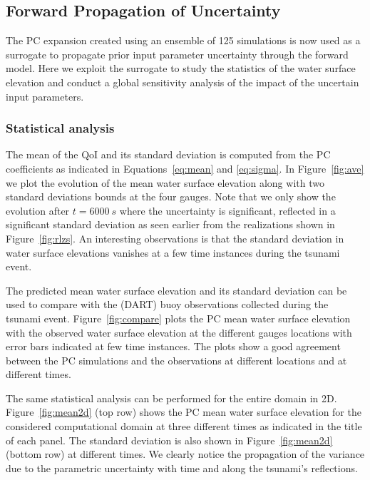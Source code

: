 \subsection{Forward Propagation of Uncertainty}
\label{sec:forward}
The PC expansion created using an ensemble of 125 \geoclaw simulations
is now used as a surrogate to propagate prior input parameter uncertainty 
through the forward model.  Here we exploit the surrogate 
to study the statistics of the water surface elevation and conduct 
a global sensitivity analysis of the impact of the uncertain input parameters.

\subsubsection{Statistical analysis}
The mean of the QoI and its standard deviation is computed
from the PC coefficients as indicated in Equations~\eqref{eq:mean} and \eqref{eq:sigma}. 
In Figure~\ref{fig:ave} we plot the evolution of
the mean water surface elevation along with two standard deviations
bounds at the four gauges.  
Note that we only show the evolution after $t=6000~s$ where the uncertainty is significant,
reflected in a significant standard deviation as seen earlier from the realizations shown 
in Figure~\ref{fig:rlzs}. An interesting observations is that the
standard deviation in water surface elevations vanishes at a few time instances
during the tsunami event.  

The predicted mean water surface elevation  and its standard deviation 
can be used to compare with the (DART) buoy observations collected during
the tsunami event. Figure~\ref{fig:compare} 
plots the PC mean water surface elevation with the observed 
water surface elevation at the different gauges locations
with error bars indicated at few time instances. 
The plots show a good agreement between the PC simulations and the 
observations at different locations and at different times. 

The same statistical analysis can be performed for the
entire domain in 2D. Figure~\ref{fig:mean2d} (top row) shows
the PC mean water surface elevation for the considered computational
domain at three different times as indicated in the title of each panel.
The standard deviation is also shown in Figure~\ref{fig:mean2d} (bottom row)
at different times. We clearly notice the propagation of the variance
due to the parametric uncertainty with time
and along the tsunami's reflections. 

